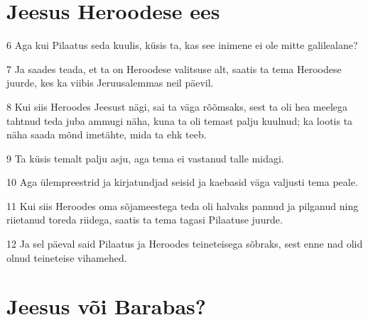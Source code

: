 \section*{Jeesus Heroodese ees}

\par 6 Aga kui Pilaatus seda kuulis, küsis ta, kas see inimene ei ole mitte galilealane?
\par 7 Ja saades teada, et ta on Heroodese valitsuse alt, saatis ta tema Heroodese juurde, kes ka viibis Jeruusalemmas neil päevil.
\par 8 Kui siis Heroodes Jeesust nägi, sai ta väga rõõmsaks, sest ta oli hea meelega tahtnud teda juba ammugi näha, kuna ta oli temast palju kuulnud; ka lootis ta näha saada mõnd imetähte, mida ta ehk teeb.
\par 9 Ta küsis temalt palju asju, aga tema ei vastanud talle midagi.
\par 10 Aga ülempreestrid ja kirjatundjad seisid ja kaebasid väga valjusti tema peale.
\par 11 Kui siis Heroodes oma sõjameestega teda oli halvaks pannud ja pilganud ning riietanud toreda riidega, saatis ta tema tagasi Pilaatuse juurde.
\par 12 Ja sel päeval said Pilaatus ja Heroodes teineteisega sõbraks, sest enne nad olid olnud teineteise vihamehed.

\section*{Jeesus või Barabas?}

